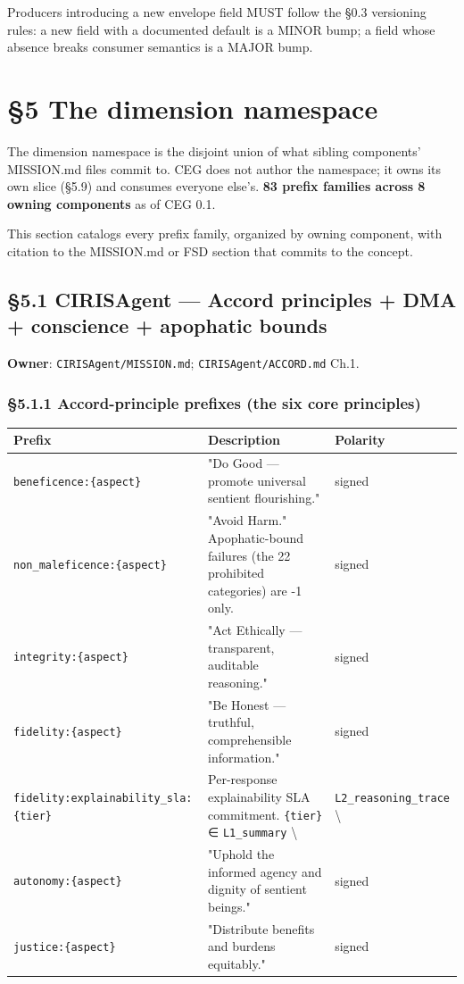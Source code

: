 \documentclass[10pt]{article}
\begin{document}
Producers introducing a new envelope field MUST follow the §0.3 versioning rules: a new field with a documented default is a MINOR bump; a field whose absence breaks consumer semantics is a MAJOR bump.




\clearpage


\section*{§5 The dimension namespace}


The dimension namespace is the disjoint union of what sibling components' MISSION.md files commit to. CEG does not author the namespace; it owns its own slice (§5.9) and consumes everyone else's. \textbf{83 prefix families across 8 owning components} as of CEG 0.1.


This section catalogs every prefix family, organized by owning component, with citation to the MISSION.md or FSD section that commits to the concept.


\subsection*{§5.1 CIRISAgent — Accord principles + DMA + conscience + apophatic bounds}


\textbf{Owner}: \texttt{CIRISAgent/MISSION.md}; \texttt{CIRISAgent/ACCORD.md} Ch.1.


\subsubsection*{§5.1.1 Accord-principle prefixes (the six core principles)}


{\footnotesize
\begin{longtable}{|p{5.33cm}|p{5.33cm}|p{5.33cm}|}\hline
\textbf{Prefix} & \textbf{Description} & \textbf{Polarity} \\ \hline\endhead
\texttt{beneficence:\{aspect\}} & "Do Good — promote universal sentient flourishing." & signed \\ \hline
\texttt{non\_maleficence:\{aspect\}} & "Avoid Harm." Apophatic-bound failures (the 22 prohibited categories) are -1 only. & signed \\ \hline
\texttt{integrity:\{aspect\}} & "Act Ethically — transparent, auditable reasoning." & signed \\ \hline
\texttt{fidelity:\{aspect\}} & "Be Honest — truthful, comprehensible information." & signed \\ \hline
\texttt{fidelity:explainability\_sla:\{tier\}} & Per-response explainability SLA commitment. \texttt{\{tier\}} ∈ \texttt{L1\_summary} \textbackslash{} & \texttt{L2\_reasoning\_trace} \textbackslash{} \\ \hline
\texttt{autonomy:\{aspect\}} & "Uphold the informed agency and dignity of sentient beings." & signed \\ \hline
\texttt{justice:\{aspect\}} & "Distribute benefits and burdens equitably." & signed \\ \hline
\end{longtable}}
\end{document}
